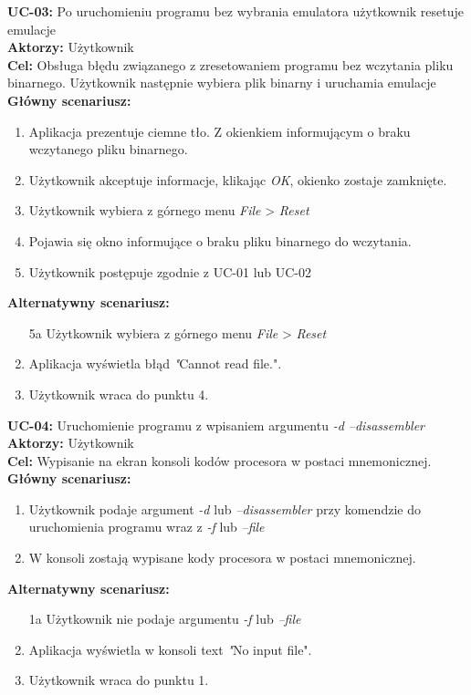 \textbf{UC-03:} Po uruchomieniu programu bez wybrania emulatora użytkownik resetuje emulacje \\
\textbf{Aktorzy:} Użytkownik \\
\textbf{Cel:} Obsługa błędu związanego z zresetowaniem programu bez wczytania pliku binarnego. Użytkownik następnie wybiera plik binarny i uruchamia emulacje\\
\textbf{Główny scenariusz:}
\begin{enumerate}
  \item Aplikacja prezentuje ciemne tło. Z okienkiem informującym o braku wczytanego pliku binarnego.
  \item Użytkownik akceptuje informacje, klikając \textit{OK}, okienko zostaje zamknięte.
  \item Użytkownik wybiera z górnego menu \textit{File} > \textit{Reset}
  \item  Pojawia się okno informujące o braku pliku binarnego do wczytania.
  \item Użytkownik postępuje zgodnie z UC-01 lub UC-02
\end{enumerate}
\textbf{Alternatywny scenariusz:}
\begin{enumerate}
  \item [5a] Użytkownik wybiera z górnego menu \textit{File} > \textit{Reset}
  \item Aplikacja wyświetla błąd \textit"Cannot read file.".
  \item Użytkownik wraca do punktu 4.
\end{enumerate}

\textbf{UC-04:} Uruchomienie programu z wpisaniem argumentu \textit{-d --disassembler} \\
\textbf{Aktorzy:} Użytkownik \\
\textbf{Cel:} Wypisanie na ekran konsoli kodów procesora w postaci mnemonicznej. \\
\textbf{Główny scenariusz:}
\begin{enumerate}
  \item Użytkownik podaje argument \textit{-d} lub \textit{ --disassembler} przy komendzie do uruchomienia programu wraz z \textit{-f} lub \textit{--file}
  \item W konsoli zostają wypisane kody procesora w postaci mnemonicznej.
\end{enumerate}
\textbf{Alternatywny scenariusz:}
\begin{enumerate}
  \item [1a] Użytkownik nie podaje argumentu \textit{-f} lub \textit{--file}
  \item Aplikacja wyświetla w konsoli text \textit"No input file".
  \item Użytkownik wraca do punktu 1.
\end{enumerate}

